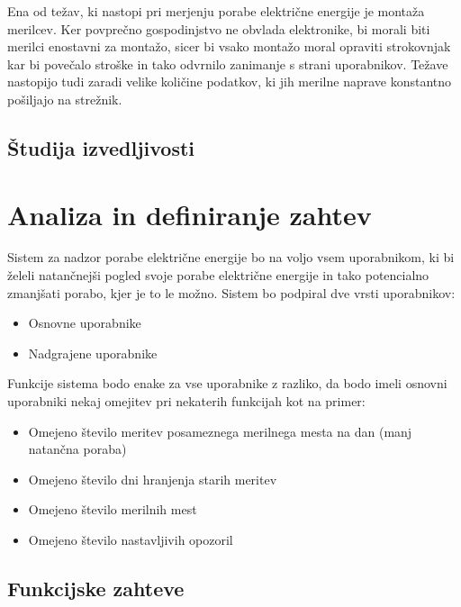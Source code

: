 \documentclass[12pt,a4paper,titlepage,openany]{report}
\begin{document}
Ena od težav, ki nastopi pri merjenju porabe električne energije je montaža merilcev. Ker povprečno gospodinjstvo ne obvlada elektronike, bi morali biti merilci enostavni za montažo, sicer bi vsako montažo moral opraviti strokovnjak kar bi povečalo stroške in tako odvrnilo zanimanje s strani uporabnikov. Težave nastopijo tudi zaradi velike količine podatkov, ki jih merilne naprave konstantno pošiljajo na strežnik. 

\section{Študija izvedljivosti}
\thispagestyle{fancy}

\chapter{Analiza in definiranje zahtev}
\thispagestyle{fancy}

Sistem za nadzor porabe električne energije bo na voljo vsem uporabnikom, ki bi želeli natančnejši pogled svoje porabe električne energije in tako potencialno zmanjšati porabo, kjer je to le možno. Sistem bo podpiral dve vrsti uporabnikov:
\begin{itemize}
\item Osnovne uporabnike
\item Nadgrajene uporabnike
\end{itemize}
Funkcije sistema bodo enake za vse uporabnike z razliko, da bodo imeli osnovni uporabniki nekaj omejitev pri nekaterih funkcijah kot na primer:
\begin{itemize}
\item Omejeno število meritev posameznega merilnega mesta na dan (manj natančna poraba)
\item Omejeno število dni hranjenja starih meritev
\item Omejeno število merilnih mest
\item Omejeno število nastavljivih opozoril
\end{itemize}


\section{Funkcijske zahteve}
\thispagestyle{fancy}
\end{document}
